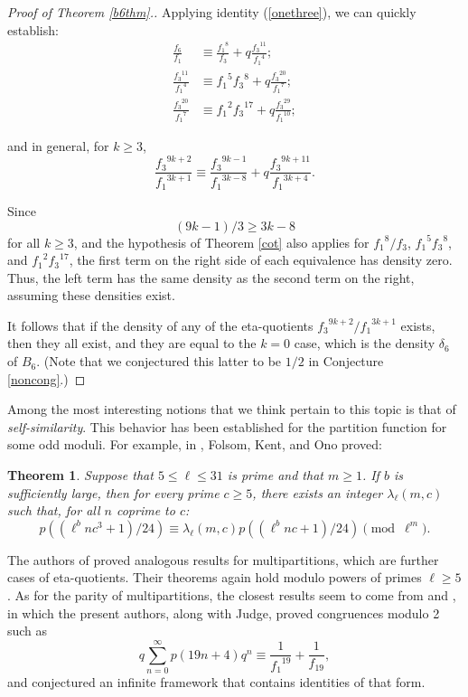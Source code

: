 \documentclass[12pt]{amsart}
\newtheorem{theorem}{Theorem}%
\theoremstyle{definition}
\begin{document}
\begin{proof}[Proof of Theorem \ref{b6thm}.] Applying identity (\ref{onethree}), we can quickly establish:
\begin{align*}\frac{f_6}{f_1} &\equiv \frac{{f_1}^8}{f_3} + q \frac{{f_3}^{11}}{{f_1}^4}; \\
\frac{{f_3}^{11}}{{f_1}^4} &\equiv {f_1}^5 {f_3}^8 + q \frac{{f_3}^{20}}{{f_1}^7}; \\
\frac{{f_3}^{20}}{{f_1}^7} &\equiv {f_1}^2 {f_3}^{17} + q \frac{{f_3}^{29}}{{f_1}^{10}};
\end{align*}

\noindent and in general, for $k \geq 3$, $$\frac{{f_3}^{9k+2}}{{f_1}^{3k+1}} \equiv \frac{{f_3}^{9k-1}}{{f_1}^{3k-8}}+ q \frac{{f_3}^{9k+11}}{{f_1}^{3k+4}}.$$

Since $$(9k-1)/3 \geq 3k-8$$ for all $k \geq 3$, and the hypothesis of Theorem \ref{cot} also applies for ${f_1}^8 / f_3$, ${f_1}^5 {f_3}^8$, and ${f_1}^2 {f_3}^{17}$, the first term on the right side of each equivalence has density zero. Thus, the left term has the same density as the second term on the right, assuming these densities exist.

It follows that if the density of any of the eta-quotients ${{f_3}^{9k+2}}/{{f_1}^{3k+1}}$ exists, then they all exist, and they are equal to the $k=0$ case, which is the density $\delta_6$ of $B_6$. (Note that we conjectured this latter to be $1/2$ in Conjecture \ref{noncong}.) \end{proof}

Among the most interesting notions that we think pertain to this topic is that of \emph{self-similarity}.  This behavior has been established for the partition function for some odd moduli.  For example, in \cite{FKO}, Folsom, Kent, and Ono proved:
\begin{theorem} Suppose that $5 \leq \ell \leq 31$ is prime and that $m \geq 1$. If $b$ is sufficiently large, then for every prime $c \geq 5$, there exists an integer $\lambda_\ell(m,c)$ such that, for all $n$ coprime to $c$: $$p \left((\ell^b n c^3 + 1)/24 \right) \equiv \lambda_\ell(m,c) p \left( (\ell^b n c + 1)/24 \right) \pmod{\ell^m}.$$
\end{theorem}

The authors of \cite{BLMT} proved analogous results for multipartitions, which are further cases of eta-quotients.  Their theorems again hold modulo powers of primes $\ell \geq 5$.  As for the parity of multipartitions, the closest results seem to come from \cite{JKZ} and \cite{JZ}, in which the present authors, along with Judge, proved congruences modulo 2 such as
$$q \sum_{n=0}^\infty p(19n+4) q^n \equiv \frac{1}{{f_1}^{19}} + \frac{1}{f_{19}},$$
and conjectured an infinite framework that contains identities of that form.  
\end{document}
